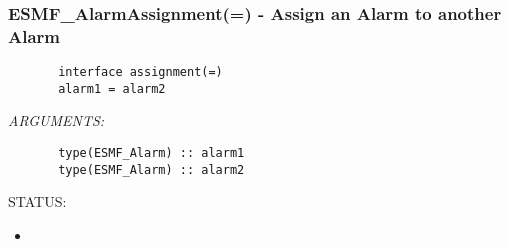  
\setlength{\oldparskip}{\parskip}
\setlength{\parskip}{1.5ex}
\setlength{\oldparindent}{\parindent}
\setlength{\parindent}{0pt}
\setlength{\oldbaselineskip}{\baselineskip}
\setlength{\baselineskip}{11pt}
 
\def\bv{\begin{verbatim}}
\def\ev{\end{verbatim}}
\def\be{\begin{equation}}
\def\ee{\end{equation}}
\def\bea{\begin{eqnarray}}
\def\eea{\end{eqnarray}}
\def\bi{\begin{itemize}}
\def\ei{\end{itemize}}
\def\bn{\begin{enumerate}}
\def\en{\end{enumerate}}
\def\bd{\begin{description}}
\def\ed{\end{description}}
\def\({\left (}
\def\){\right )}
\def\[{\left [}
\def\]{\right ]}
\def\<{\left  \langle}
\def\>{\right \rangle}
\def\cI{{\cal I}}
\def\diag{\mathop{\rm diag}}
\def\tr{\mathop{\rm tr}}


 
\subsubsection [ESMF\_AlarmAssignment(=)] {ESMF\_AlarmAssignment(=) - Assign an Alarm to another Alarm}


  
\begin{verbatim}       interface assignment(=)
       alarm1 = alarm2\end{verbatim}{\em ARGUMENTS:}
\begin{verbatim}       type(ESMF_Alarm) :: alarm1
       type(ESMF_Alarm) :: alarm2\end{verbatim}
{\sf STATUS:}
   \begin{itemize}
   \item{}
   \end{itemize}
  
